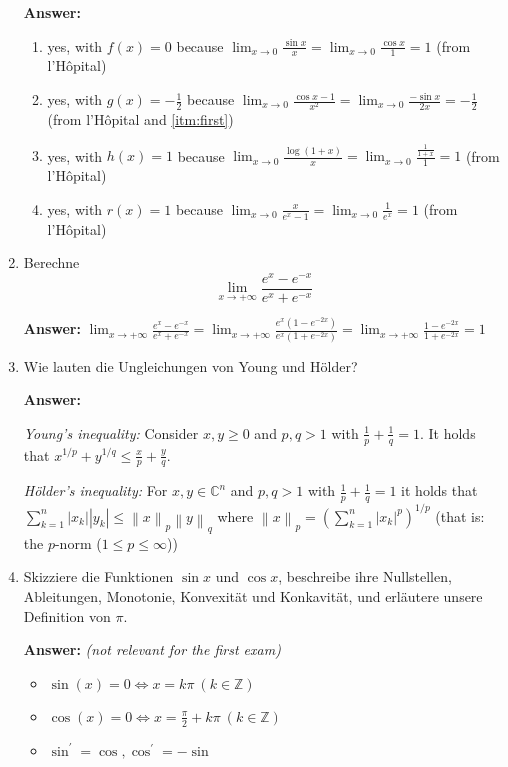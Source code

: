 \documentclass[11pt]{article}
\newcommand{\norm}[1]{\left\lVert#1\right\rVert}
\newcommand{\abs}[1]{\left|#1\right|}
\newcommand{\sumn}[4]{\sum_{#1=#2}^{#3}{#4}}
\newcommand{\CC}[0]{\mathbb{C}}
\newcommand{\ZZ}[0]{\mathbb{Z}}
\begin{document}
\begin{enumerate}
    \textbf{Answer:}

    \begin{enumerate}
        \item \label{itm:first} yes, with $f(x) = 0$ because $\lim_{x\to0}\frac{\sin{x}}{x} = \lim_{x\to0} \frac{\cos{x}}{1} = 1$ (from l'Hôpital)
        \item yes, with $g(x) = -\frac{1}{2}$ because $\lim_{x \to 0}\frac{\cos{x} - 1}{x^2} = \lim_{x \to 0}\frac{-\sin{x}}{2x} = -\frac{1}{2}$ (from l'Hôpital and \ref{itm:first})
        \item yes, with $h(x) = 1$ because $\lim_{x \to 0}\frac{\log(1+x)}{x} = \lim_{x \to 0}\frac{\frac{1}{1+x}}{1} = 1$ (from l'Hôpital)
        \item yes, with $r(x) = 1$ because $\lim_{x \to 0}\frac{x}{e^x -1} = \lim_{x \to 0}\frac{1}{e^x} = 1$ (from l'Hôpital)
    \end{enumerate}

    \item Berechne
    $$\lim_{x \to +\infty}\frac{e^x - e^{-x}}{e^x + e^{-x}}$$

    \textbf{Answer:}
    $\lim_{x \to +\infty}\frac{e^x - e^{-x}}{e^x + e^{-x}} = \lim_{x \to +\infty}\frac{e^x(1 - e^{-2x})}{e^x(1 + e^{-2x})} = \lim_{x \to +\infty}\frac{1 - e^{-2x}}{1 + e^{-2x}} = 1$
    \item Wie lauten die Ungleichungen von Young und Hölder?
    
    \textbf{Answer:}

    \textit{Young's inequality:} Consider $x, y \ge 0$ and $p, q > 1$ with $\frac{1}{p} + \frac{1}{q} = 1$. It holds that $x^{1/p} + y^{1/q} \le \frac{x}{p} + \frac{y}{q}$.

    \textit{Hölder's inequality:} For $x, y \in \CC^n$ and $p, q > 1$ with $\frac{1}{p} + \frac{1}{q} = 1$ it holds that $\sumn{k}{1}{n}{\abs{x_k} \abs{y_k}} \le \norm{x}_p \norm{y}_q$ where $\norm{x}_p = \left(\sumn{k}{1}{n}{\abs{x_k}^p}\right)^{1/p}$ (that is: the $p$-norm ($1 \le p \le \infty$))

    
    \item Skizziere die Funktionen $\sin{x}$ und $\cos{x}$, beschreibe ihre Nullstellen, Ableitungen, Monotonie, Konvexität und Konkavität, und erläutere unsere Definition von $\pi$.

    \textbf{Answer:} \textit{(not relevant for the first exam)}
    \begin{itemize}
        \item $\sin(x) = 0 \Leftrightarrow x = k\pi~(k \in \ZZ)$
        \item $\cos(x) = 0 \Leftrightarrow x = \frac{\pi}{2} + k\pi~(k \in \ZZ)$
        \item $\sin^\prime = \cos, \cos^\prime = -\sin$
    \end{itemize}
    



\end{enumerate}
\end{document}
